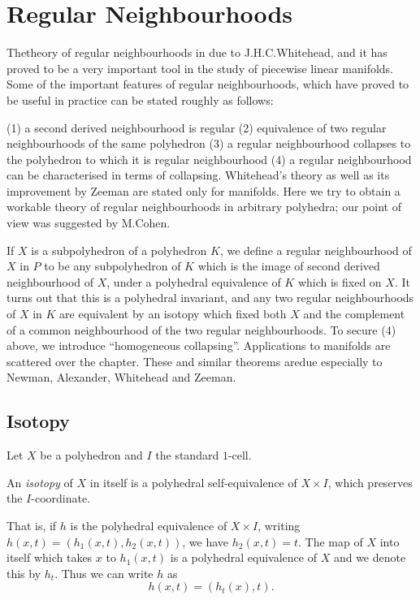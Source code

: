 
\chapter{Regular Neighbourhoods}\label{chap6}

The\pageoriginale theory of regular neighbourhoods in due to J.H.C.\@ Whitehead, and it has proved to be a very important tool in the study of piecewise linear manifolds. Some of the important features of regular neighbourhoods, which have proved to be useful in practice can be stated roughly as follows:

(1) a second derived neighbourhood is regular (2) equivalence of two regular neighbourhoods of the same polyhedron (3) a regular neighbourhood collapses to the polyhedron to which it is regular neighbourhood (4) a regular neighbourhood can be characterised in terms of collapsing. Whitehead's theory as well as its improvement by Zeeman are stated only for manifolds. Here we try to obtain a workable theory of regular neighbourhoods in arbitrary polyhedra; our point of view was suggested by M.\@ Cohen.

If $X$ is a subpolyhedron of a polyhedron $K$, we define a regular neighbourhood of $X$ in $P$ to be any subpolyhedron of $K$ which is the image of second derived neighbourhood of $X$, under a polyhedral equivalence of $K$ which is fixed on $X$. It turns out that this is a polyhedral invariant, and any two regular neighbourhoods of $X$ in $K$ are equivalent by an isotopy which fixed both $X$ and the complement of a common neighbourhood of the two regular neighbourhoods. To secure (4) above, we introduce ``homogeneous collapsing''. Applications to manifolds are scattered over the chapter. These and similar theorems are\pageoriginale due especially to Newman, Alexander, Whitehead and Zeeman.


\section{Isotopy}\label{chap6-sec6.1}

Let $X$ be a polyhedron and $I$ the standard $1$-cell.

\begin{definition}\label{chap6-defi6.1.1}
An {\em isotopy} of $X$ in itself is a polyhedral self-equiva\-lence of $X\times I$, which preserves the $I$-coordinate.
\end{definition}

That is, if $h$ is the polyhedral equivalence of $X\times I$, writing $h(x,t)=(h_{1}(x,t),h_{2}(x,t))$, we have $h_{2}(x,t)=t$. The map of $X$ into itself which takes $x$ to $h_{1}(x,t)$ is a polyhedral equivalence of $X$ and we denote this by $h_{t}$. Thus we can write $h$ as 
$$
h(x,t)=(h_{t}(x),t).
$$

